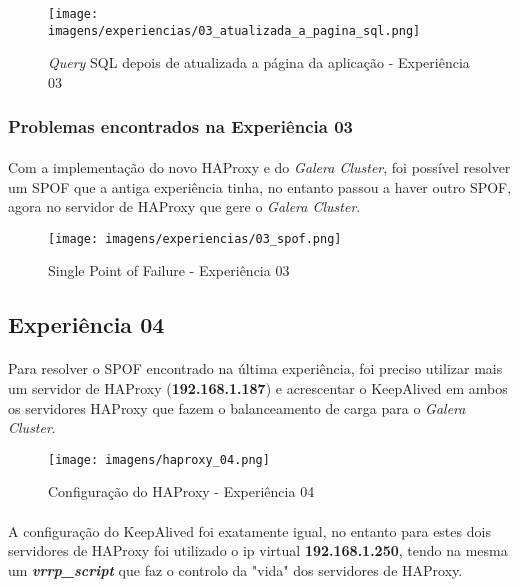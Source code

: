 \documentclass{report}
\begin{document}
\begin{figure}[H]
\center
\texttt{[image: imagens/experiencias/03\_atualizada\_a\_pagina\_sql.png]}
\caption{\emph{Query} SQL depois de atualizada a página da aplicação - Experiência 03}
\label{fig.nav}
\end{figure}


\subsubsection{Problemas encontrados na Experiência 03}
\paragraph{}
Com a implementação do novo HAProxy e do \emph{Galera Cluster}, foi possível resolver um SPOF que a antiga experiência tinha, no entanto passou a haver outro SPOF, agora no servidor de HAProxy que gere o \emph{Galera Cluster}. 

\begin{figure}[H]
\center
\texttt{[image: imagens/experiencias/03\_spof.png]}
\caption{Single Point of Failure - Experiência 03}
\label{fig.nav}
\end{figure}

\subsection{Experiência 04}
\paragraph{}
Para resolver o SPOF encontrado na última experiência, foi preciso utilizar mais um servidor de HAProxy (\textbf{192.168.1.187}) e acrescentar o KeepAlived em ambos os servidores HAProxy que fazem o balanceamento de carga para o \emph{Galera Cluster}.

\begin{figure}[H]
\center
\texttt{[image: imagens/haproxy\_04.png]}
\caption{Configuração do HAProxy - Experiência 04}
\label{fig.nav}
\end{figure}


\paragraph{}
A configuração do KeepAlived foi exatamente igual, no entanto para estes dois servidores de HAProxy foi utilizado o ip virtual \textbf{192.168.1.250}, tendo na mesma um \textbf{\emph{vrrp\_script}} que faz o controlo da "vida" dos servidores de HAProxy.
\end{document}

